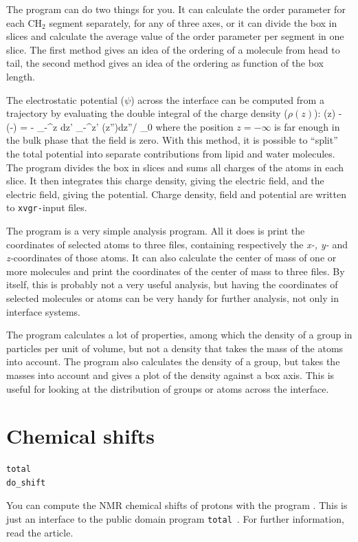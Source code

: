 The program can do two things for you. It can calculate the order
parameter for each CH$_2$ segment separately, for any of three axes,
or it can divide the box in slices and calculate the average value of
the order parameter per segment in one slice. The first method gives
an idea of the ordering of a molecule from head to tail, the second
method gives an idea of the ordering as function of the box length.

The electrostatic potential ($\psi$) across the interface can be
computed from a trajectory by evaluating the double integral of the
charge density ($\rho(z)$):
\beq
\psi(z) - \psi(-\infty) = - \int_{-\infty}^z dz' \int_{-\infty}^{z'} \rho(z'')dz''/ \epsilon_0 
\label{eqn:elpotgr}
\eeq
where the position $z=-\infty$ is far enough in the bulk phase that
the field is zero.  With this method, it is possible to ``split'' the
total potential into separate contributions from lipid and water
molecules. The program {\tt {}} divides the box in slices and
sums all charges of the atoms in each slice. It then integrates this
charge density, giving the electric field, and the electric field,
giving the potential. Charge density, field and potential are written
to {\tt xvgr-}input files.

The program {\tt {}} is a very simple analysis program. All it
does is print the coordinates of selected atoms to three files,
containing respectively the {\em x-, y-} and {\em z-}coordinates of
those atoms. It can also calculate the center of mass of one or more
molecules and print the coordinates of the center of mass to three
files. By itself, this is probably not a very useful analysis, but
having the coordinates of selected molecules or atoms can be very
handy for further analysis, not only in interface systems.

The program {\tt {}} calculates a lot of properties, among which
the density of a group in particles per unit of volume, but not a
density that takes the mass of the atoms into account. The program
{\tt {}} also calculates the density of a group, but takes the
masses into account and gives a plot of the density against a box
axis. This is useful for looking at the distribution of groups or
atoms across the interface.


\section{Chemical shifts}
\begin{verbatim}
total
do_shift
\end{verbatim}
You can compute the NMR chemical shifts of protons with the program
{\tt {}}. This is just an {\gromacs} interface to the public
domain program {\tt total}~\cite{Williamson93a}. For further
information, read the article.

